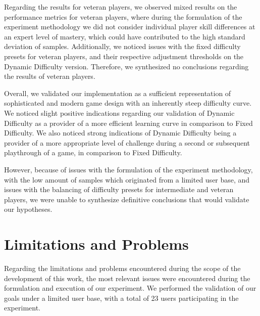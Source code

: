 Regarding the results for veteran players, we observed mixed results on the performance metrics for veteran players, where during the formulation of the experiment methodology we did not consider individual player skill differences at an expert level of mastery, which could have contributed to the high standard deviation of samples. Additionally, we noticed issues with the fixed difficulty presets for veteran players, and their respective adjustment thresholds on the Dynamic Difficulty version. Therefore, we synthesized no conclusions regarding the results of veteran players.

Overall, we validated our implementation as a sufficient representation of sophisticated and modern game design with an inherently steep difficulty curve. We noticed slight positive indications regarding our validation of Dynamic Difficulty as a provider of a more efficient learning curve in comparison to Fixed Difficulty. We also noticed strong indications of Dynamic Difficulty being a provider of a more appropriate level of challenge during a second or subsequent playthrough of a game, in comparison to Fixed Difficulty.

However, because of issues with the formulation of the experiment methodology, with the low amount of samples which originated from a limited user base, and issues with the balancing of difficulty presets for intermediate and veteran players, we were unable to synthesize definitive conclusions that would validate our hypotheses.

\section{Limitations and Problems}

Regarding the limitations and problems encountered during the scope of the development of this work, the most relevant issues were encountered during the formulation and execution of our experiment. We performed the validation of our goals under a limited user base, with a total of 23 users participating in the experiment.

